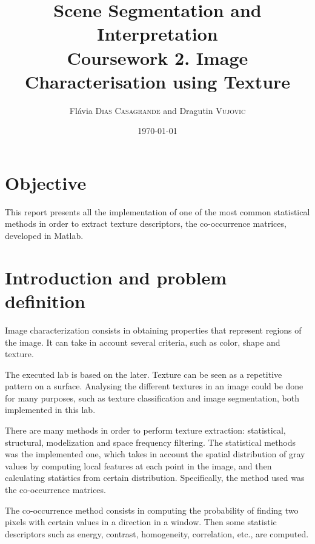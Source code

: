 \documentclass{article}
\title{Scene Segmentation and Interpretation\\Coursework 2. Image Characterisation using Texture} %
\author{Fl\'{a}via \textsc{Dias Casagrande} and Dragutin \textsc{Vujovic}} %
\date{\today} %
\begin{document}
\maketitle %



\section{Objective}

This report presents all the implementation of one of the most common statistical methods in order to extract texture descriptors, the co-occurrence matrices, developed in Matlab.


\section{Introduction and problem definition}

Image characterization consists in obtaining properties that
represent regions of the image. It can take in account several criteria, such as color, shape and texture.

The executed lab is based on the later. Texture can be seen as a repetitive pattern on a surface. Analysing the different textures in an image could be done for many purposes, such as texture classification and image segmentation, both implemented in this lab.

There are many methods in order to perform texture extraction: statistical, structural, modelization and space frequency filtering. The statistical methods was the implemented one, which takes in account the spatial distribution of gray values by computing local features at each point in
the image, and then calculating statistics from certain distribution. Specifically, the method used was the co-occurrence matrices.

The co-occurrence method consists in computing the probability of finding two pixels with certain values in a direction in a window. Then some statistic descriptors such as energy, contrast, homogeneity, correlation, etc., are computed.
\end{document}
